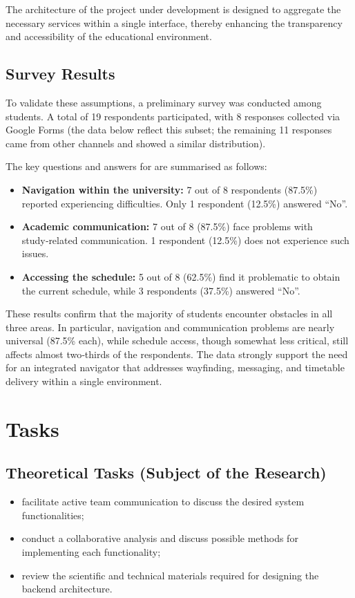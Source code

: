 \documentclass[a4paper, 14pt]{extreport}
\begin{document}
The architecture of the project under development is designed to aggregate the necessary services within a single interface, thereby enhancing the transparency and accessibility of the educational environment.

\subsection{Survey Results}
To validate these assumptions, a preliminary survey was conducted among students. A total of 19 respondents participated, with 8 responses collected via Google Forms (the data below reflect this subset; the remaining 11 responses came from other channels and showed a similar distribution).

The key questions and answers for are summarised as follows:

\begin{itemize}
    \item \textbf{Navigation within the university:}  
    7 out of 8 respondents (87.5\%) reported experiencing difficulties. Only 1 respondent (12.5\%) answered ``No''.
    \item \textbf{Academic communication:}  
    7 out of 8 (87.5\%) face problems with study‑related communication. 1 respondent (12.5\%) does not experience such issues.
    \item \textbf{Accessing the schedule:}  
    5 out of 8 (62.5\%) find it problematic to obtain the current schedule, while 3 respondents (37.5\%) answered ``No''.
\end{itemize}

These results confirm that the majority of students encounter obstacles in all three areas. In particular, navigation and communication problems are nearly universal (87.5\% each), while schedule access, though somewhat less critical, still affects almost two‑thirds of the respondents. The data strongly support the need for an integrated navigator that addresses wayfinding, messaging, and timetable delivery within a single environment.

\section{Tasks}

\subsection{Theoretical Tasks (Subject of the Research)}
\begin{itemize}
	\item facilitate active team communication to discuss the desired system functionalities;
	\item conduct a collaborative analysis and discuss possible methods for implementing each functionality;
	\item review the scientific and technical materials required for designing the backend architecture.
\end{itemize}
\end{document}
